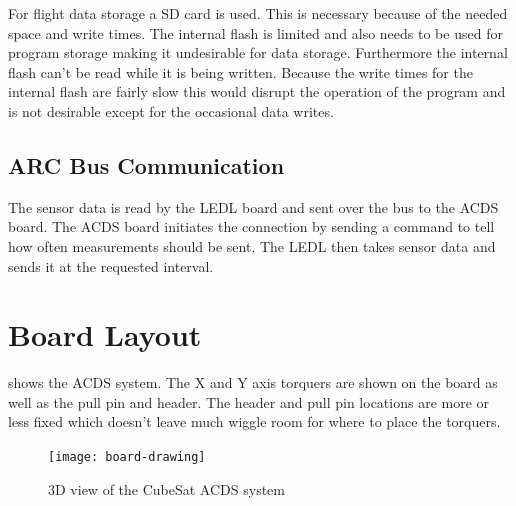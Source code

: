 For flight data storage a SD card is used. This is necessary because of the needed space and write times. The internal flash is limited and also needs to be used for program storage making it undesirable for data storage. Furthermore the internal flash can't be read while it is being written. Because the write times for the internal flash are fairly slow this would disrupt the operation of the program and is not desirable except for the occasional data writes.

\subsection{\acs{ARC} Bus Communication}

The sensor data is read by the \ac{LEDL} board and sent over the bus to the \ac{ACDS} board. The \ac{ACDS} board initiates the connection by sending a command to tell how often measurements should be sent. The \ac{LEDL} then takes sensor data and sends it at the requested interval.

\section{Board Layout}

 shows the \ac{ACDS} system. The X and Y axis torquers are shown on the board as well as the pull pin and header. The header and pull pin locations are more or less fixed which doesn't leave much wiggle room for where to place the torquers.

\begin{figure}[H]
    \centering
    \texttt{[image: board-drawing]}
    \caption{3D view of the CubeSat \acs{ACDS} system}
    \label{fig:3dview}
\end{figure}

